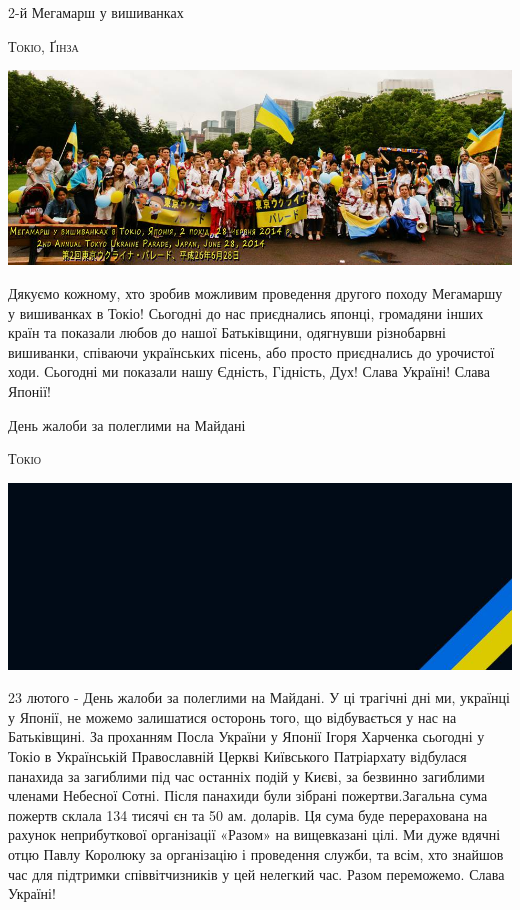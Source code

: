 \documentclass[10pt,a4paper]{article}
\newcommand{\NewsItem}[1]{%
		\usefont{T2A}{iwona}{m}{n} 
		\large #1 \vspace{4pt}
		\par \normalsize \normalfont}
\newcommand{\NewsAuthor}[1]{%
			\hfill \textsc{#1} \vspace{4pt}
			\par \normalfont}
\begin{document}
\begin{multicols}{3}
\vspace{3cm}
\NewsItem{2-й Мегамарш у вишиванках}
\NewsAuthor{Токіо, Ґінза}
		\begin{center}
			\includegraphics[width=0.8\linewidth]{images/megamarsh2004}
		\end{center}
Дякуємо кожному, хто зробив можливим проведення другого походу Мегамаршу у вишиванках в Токіо! Сьогодні до нас приєднались японці, громадяни інших країн та показали любов до нашої Батьківщини, одягнувши різнобарвні вишиванки, співаючи українських пісень, або просто приєднались до урочистої ходи. Сьогодні ми показали нашу Єдність, Гідність, Дух! Слава Україні! Слава Японії!

\vspace{1cm}
\NewsItem{День жалоби за полеглими на Майдані}
\NewsAuthor{Токіо}
		\begin{center}
			\includegraphics[width=0.8\linewidth]{images/den-zhaloby}
		\end{center}
23 лютого - День жалоби за полеглими на Майдані. У ці трагічні дні ми, українці у Японії, не можемо залишатися осторонь того, що відбувається у нас на Батьківщині.
За проханням Посла України у Японії Ігоря Харченка сьогодні у Токіо в Українській Православній Церкві Київського Патріархату відбулася панахида за загиблими під час останніх подій у Києві, за безвинно загиблими членами Небесної Сотні.
Після панахиди були зібрані пожертви.Загальна сума пожертв склала 134 тисячі єн та 50 ам. доларів. Ця сума буде перерахована на рахунок неприбуткової організації «Разом» на вищевказані цілі.
Ми дуже вдячні отцю Павлу Королюку за організацію і проведення служби, та всім, хто знайшов час для підтримки співвітчизників у цей нелегкий час.
Разом переможемо. Слава Україні!
\end{multicols}
\end{document}
